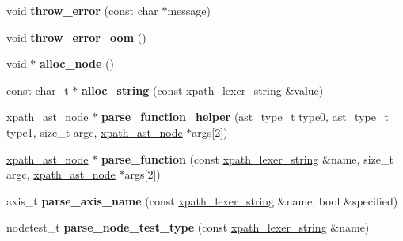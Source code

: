 \begin{DoxyCompactItemize}
\item 
\mbox{\label{structxpath__parser_a043353db574741cd4f460a042a0b22c6}} 
void {\bfseries throw\+\_\+error} (const char $\ast$message)
\item 
\mbox{\label{structxpath__parser_aeb5c7d7a6f8c5705a769297f42960c3e}} 
void {\bfseries throw\+\_\+error\+\_\+oom} ()
\item 
\mbox{\label{structxpath__parser_ae33adcc8eb125124967d95297daff351}} 
void $\ast$ {\bfseries alloc\+\_\+node} ()
\item 
\mbox{\label{structxpath__parser_a109e4c472bb76911a2b49ee741d400af}} 
const char\+\_\+t $\ast$ {\bfseries alloc\+\_\+string} (const \hyperlink{structxpath__lexer__string}{xpath\+\_\+lexer\+\_\+string} \&value)
\item 
\mbox{\label{structxpath__parser_a21a1a2579c610e0ebd76247b9d325bb1}} 
\hyperlink{classxpath__ast__node}{xpath\+\_\+ast\+\_\+node} $\ast$ {\bfseries parse\+\_\+function\+\_\+helper} (ast\+\_\+type\+\_\+t type0, ast\+\_\+type\+\_\+t type1, size\+\_\+t argc, \hyperlink{classxpath__ast__node}{xpath\+\_\+ast\+\_\+node} $\ast$args\mbox{[}2\mbox{]})
\item 
\mbox{\label{structxpath__parser_a7acb32147ef3aac058f94257b57ff14f}} 
\hyperlink{classxpath__ast__node}{xpath\+\_\+ast\+\_\+node} $\ast$ {\bfseries parse\+\_\+function} (const \hyperlink{structxpath__lexer__string}{xpath\+\_\+lexer\+\_\+string} \&name, size\+\_\+t argc, \hyperlink{classxpath__ast__node}{xpath\+\_\+ast\+\_\+node} $\ast$args\mbox{[}2\mbox{]})
\item 
\mbox{\label{structxpath__parser_ad67ec26e0e286ca1bb5144a79e3a3583}} 
axis\+\_\+t {\bfseries parse\+\_\+axis\+\_\+name} (const \hyperlink{structxpath__lexer__string}{xpath\+\_\+lexer\+\_\+string} \&name, bool \&specified)
\item 
\mbox{\label{structxpath__parser_a7b4555d7bfdb90971333c46963d5d791}} 
nodetest\+\_\+t {\bfseries parse\+\_\+node\+\_\+test\+\_\+type} (const \hyperlink{structxpath__lexer__string}{xpath\+\_\+lexer\+\_\+string} \&name)

\end{DoxyCompactItemize}
